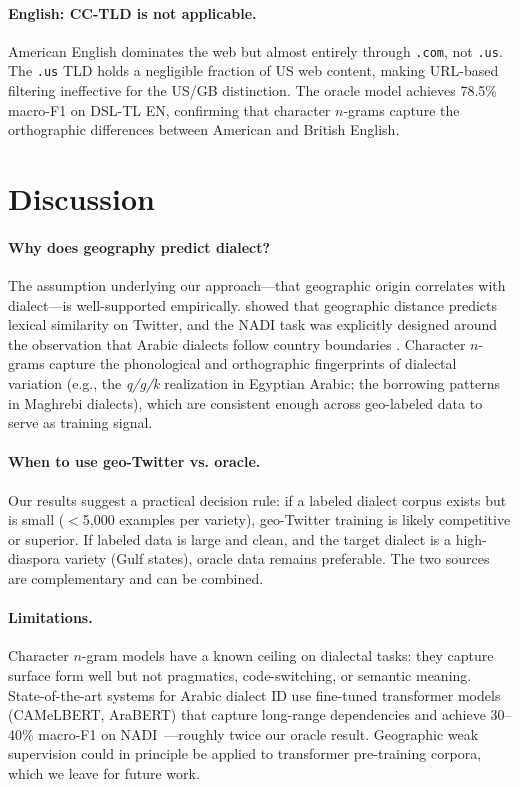 \documentclass[11pt]{article}
\begin{document}
\paragraph{English: CC-TLD is not applicable.}
American English dominates the web but almost entirely through \texttt{.com},
not \texttt{.us}.  The \texttt{.us} TLD holds a negligible fraction of US web
content, making URL-based filtering ineffective for the US/GB distinction.
The oracle model achieves 78.5\% macro-F1 on DSL-TL EN, confirming that
character $n$-grams capture the orthographic differences between American and
British English.

\section{Discussion}
\label{sec:discussion}

\paragraph{Why does geography predict dialect?}
The assumption underlying our approach---that geographic origin correlates with
dialect---is well-supported empirically. \citet{eisenstein-etal-2010-latent} showed
that geographic distance predicts lexical similarity on Twitter, and the
NADI task was explicitly designed around the observation that Arabic dialects
follow country boundaries \cite{abdul-mageed-etal-2020-nadi}. Character $n$-grams
capture the phonological and orthographic fingerprints of dialectal variation
(e.g., the \textit{q/g/k} realization in Egyptian Arabic; the borrowing patterns
in Maghrebi dialects), which are consistent enough across geo-labeled data to
serve as training signal.

\paragraph{When to use geo-Twitter vs. oracle.}
Our results suggest a practical decision rule: if a labeled dialect corpus
exists but is small ($<$5{,}000 examples per variety), geo-Twitter training is
likely competitive or superior.  If labeled data is large and clean, and the
target dialect is a high-diaspora variety (Gulf states), oracle data remains
preferable.  The two sources are complementary and can be combined.

\paragraph{Limitations.}
Character $n$-gram models have a known ceiling on dialectal tasks: they capture
surface form well but not pragmatics, code-switching, or semantic meaning.
State-of-the-art systems for Arabic dialect ID use fine-tuned transformer models
(CAMeLBERT, AraBERT) that capture long-range dependencies and achieve 30--40\%
macro-F1 on NADI~\cite{abdul-mageed-etal-2020-nadi}---roughly twice our oracle
result. Geographic weak supervision could in principle be applied to transformer
pre-training corpora, which we leave for future work.
\end{document}

